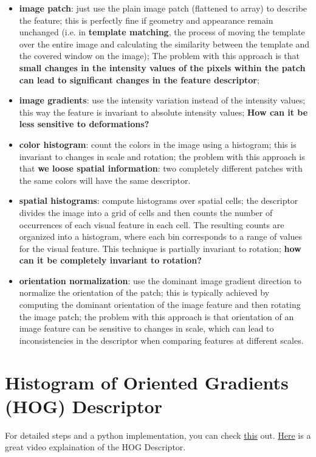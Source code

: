 \documentclass{article}
\begin{document}
\begin{itemize}
    \item \textbf{image patch}: just use the plain image patch (flattened to array) to describe the feature; this is perfectly fine if geometry and appearance remain unchanged (i.e. in \textbf{template matching}, the process of moving the template over the entire image and calculating the similarity between the template and the covered window on the image); The problem with this approach is that \textbf{small changes in the intensity values of the pixels within the patch can lead to significant changes in the feature descriptor};
    \item \textbf{image gradients}: use the intensity variation instead of the intensity values; this way the feature is invariant to absolute intensity values; \textbf{How can it be less sensitive to deformations?}
    \item \textbf{color histogram}: count the colors in the image using a histogram; this is invariant to changes in scale and rotation; the problem with this approach is that \textbf{we loose spatial information}: two completely different patches with the same colors will have the same descriptor.
    \item \textbf{spatial histograms}: compute histograms over spatial cells; the descriptor divides the image into a grid of cells and then counts the number of occurrences of each visual feature in each cell. The resulting counts are organized into a histogram, where each bin corresponds to a range of values for the visual feature. This technique is partially invariant to rotation; \textbf{how can it be completely invariant to rotation?}
    \item \textbf{orientation normalization}: use the dominant image gradient direction to normalize the orientation of the patch; this is typically achieved by computing the dominant orientation of the image feature and then rotating the image patch; the problem with this approach is that orientation of an image feature can be sensitive to changes in scale, which can lead to inconsistencies in the descriptor when comparing features at different scales.
\end{itemize}

\section*{Histogram of Oriented Gradients (HOG) Descriptor}

For detailed steps and a python implementation, you can check \href{https://www.analyticsvidhya.com/blog/2019/09/feature-engineering-images-introduction-hog-feature-descriptor/}{this} out.
\href{https://www.analyticsvidhya.com/blog/2019/09/feature-engineering-images-introduction-hog-feature-descriptor/}{Here} is a great video explaination of the HOG Descriptor.
\end{document}
